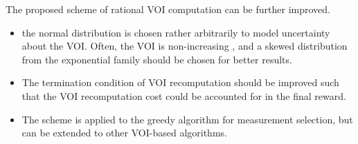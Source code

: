 The proposed scheme of rational VOI computation can be further
improved.
\begin{itemize}
\item  the normal distribution is chosen rather arbitrarily to model
  uncertainty about the VOI. Often, the VOI is non-increasing
  \cite{Guestrin.submodular}, and a skewed distribution from the
  exponential family should be chosen for better results.
\item The termination condition of VOI recomputation should be
  improved such that the VOI recomputation cost could be accounted for
  in the final reward.
\item The scheme is applied to the greedy algorithm
  for measurement selection, but can be extended to other
  VOI-based algorithms.
\end{itemize}
